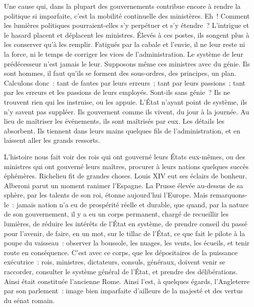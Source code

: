 \documentclass[french,twoside]{book} %
\begin{document}
Une cause qui, dans la plupart des gouvernements contribue encore à rendre la politique si imparfaite, c’est la mobilité continuelle des ministères. Eh ! Comment les lumières politiques pourraient-elles s’y perpétuer et s’y étendre ? L’intrigue et le hasard placent et déplacent les ministres. Élevés à ces postes, ils songent plus à les conserver qu’à les remplir. Fatigués par la cabale et l’envie, il ne leur reste ni la force, ni le temps de corriger les vices de l’administration. Le système de leur prédécesseur n’est jamais le leur. Supposons même ces ministres avec du génie. Ils sont hommes, il faut qu’ils se forment des sous-ordres, des principes, un plan. Calculons donc : tant de fautes par leurs erreurs ; tant par leurs passions ; tant par les erreurs et les passions de leurs employés. Sont-ils sans génie ? Ils ne trouvent rien qui les instruise, ou les appuie. L’État n’ayant point de système, ils n’y savent pas suppléer. Ils gouvernent comme ils vivent, du jour à la journée. Au lieu de maîtriser les événements, ils sont maîtrisés par eux. Les détails les absorbent. Ils tiennent dans leurs mains quelques fils de l’administration, et en laissent aller les grands ressorts.\par
L’histoire nous fait voir des rois qui ont gouverné leurs États eux-mêmes, ou des ministres qui ont gouverné leurs maîtres, procurer à leurs nations quelques succès éphémères. Richelieu fit de grandes choses. Louis XIV eut ses éclairs de bonheur. Alberoni parut un moment ranimer l’Espagne. La Prusse élevée au-dessus de sa sphère, par les talents de son roi, étonne aujourd’hui l’Europe. Mais remarquons-le : jamais nation n’a eu de prospérité réelle et durable, que quand, par la nature de son gouvernement, il y a eu un corps permanent, chargé de recueillir les lumières, de réduire les intérêts de l’État en système, de prendre conseil du passé pour l’avenir, de faire, en un mot, sur le tillac de l’État, ce que fait le pilote à la poupe du vaisseau : observer la boussole, les nuages, les vents, les écueils, et tenir route en conséquence. C’est avec ce corps, que les dépositaires de la puissance exécutrice : rois, ministres, dictateurs, consuls, généraux, doivent venir se raccorder, consulter le système général de l’État, et prendre des délibérations. Ainsi était constituée l’ancienne Rome. Ainsi l’est, à quelques égards, l’Angleterre par son parlement : image bien imparfaite d’ailleurs de la majesté et des vertus du sénat romain.\par
\end{document}
